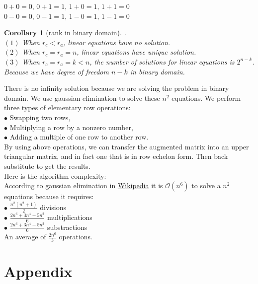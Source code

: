 \documentclass[A4,12pt]{article}
\newtheorem{corollary}{Corollary}[section]
\begin{document}
\begin{enumerate}[6.]
\begin{enumerate}[8.]
\begin{enumerate}[9.]
$0+0=0,\, 0+1=1,\, 1+0=1,\, 1+1=0$\\
$0-0=0,\, 0-1=1,\, 1-0=1,\, 1-1=0$\\
\begin{corollary}[rank in binary domain]
\label{rank in binary domain}.\\
$(1)$ When $r_c < r_a$, linear equations have no solution.\\
$(2)$ When $r_c = r_a = n$, linear equations have unique solution.\\
$(3)$ When $r_c = r_a = k < n$, the number of solutions for linear equations is $2^{n-k}$. Because we have degree of freedom $n-k$ in binary domain.
\end{corollary}
There is no infinity solution because we are solving the problem in binary domain.
We use gaussian elimination to solve these $n^2$ equations. We perform three types of elementary row operations:\\
$\bullet$ Swapping two rows,\\
$\bullet$ Multiplying a row by a nonzero number,\\
$\bullet$ Adding a multiple of one row to another row.\\

By using above operations, we can transfer the augmented matrix into an upper triangular matrix, and in fact one that is in row echelon form. Then back substitute to get the results.\\
Here is the algorithm complexity:\\
According to gaussian elimination in  \href{https://en.wikipedia.org/wiki/Gaussian_elimination#Computational_efficiency}{
Wikipedia} it is $\mathcal{O}(n^6)$ to solve a $n^2$ equations because it requires:\\
$\bullet$ $\frac{n^2(n^2+1)}{2}$ divisions\\
$\bullet$ $\frac{2n^6+3n^4-5n^2}{6}$ multiplications\\
$\bullet$ $\frac{2n^6+3n^4-5n^2}{6}$ substractions\\

An average of $\frac{2n^6}{3}$ operations.

\end{enumerate}
\end{enumerate}
\end{enumerate}

\appendix
\clearpage
\section*{Appendix}
\end{document}
